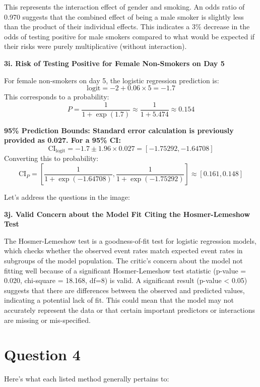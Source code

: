 \documentclass{article}
\begin{document}
This represents the interaction effect of gender and smoking. An odds ratio of 0.970 suggests that the combined effect of being a male smoker is slightly less than the product of their individual effects. This indicates a 3\% decrease in the odds of testing positive for male smokers compared to what would be expected if their risks were purely multiplicative (without interaction).

\textbf{3i. Risk of Testing Positive for Female Non-Smokers on Day 5}

For female non-smokers on day 5, the logistic regression prediction is:
\[
\text{logit} = -2 + 0.06 \times 5 = -1.7
\]
This corresponds to a probability:
\[
P = \frac{1}{1 + \exp(1.7)} \approx \frac{1}{1 + 5.474} \approx 0.154
\]

\textbf{95\% Prediction Bounds:
Standard error calculation is previously provided as 0.027. For a 95\% CI:}
\[
\text{CI}_{\text{logit}} = -1.7 \pm 1.96 \times 0.027 = [-1.75292, -1.64708]
\]
Converting this to probability:
\[
\text{CI}_{P} = \left[\frac{1}{1 + \exp(-1.64708)}, \frac{1}{1 + \exp(-1.75292)}\right] \approx [0.161, 0.148]
\]

Let's address the questions in the image:

\textbf{3j. Valid Concern about the Model Fit Citing the Hosmer-Lemeshow Test}

The Hosmer-Lemeshow test is a goodness-of-fit test for logistic regression models, which checks whether the observed event rates match expected event rates in subgroups of the model population. The critic's concern about the model not fitting well because of a significant Hosmer-Lemeshow test statistic (p-value = 0.020, chi-square = 18.168, df=8) is valid. A significant result (p-value < 0.05) suggests that there are differences between the observed and predicted values, indicating a potential lack of fit. This could mean that the model may not accurately represent the data or that certain important predictors or interactions are missing or mis-specified.

\section{Question 4}

Here's what each listed method generally pertains to:
\end{document}
